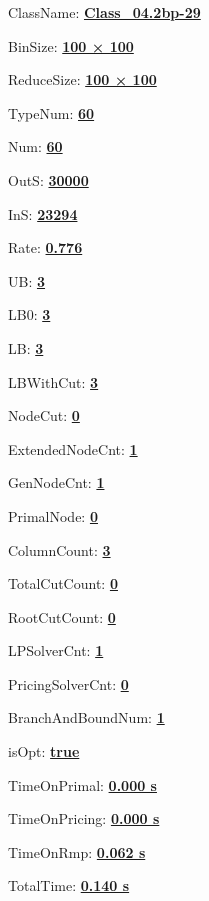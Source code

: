 \documentclass[11pt]{article}
\begin{document}
\pagestyle{empty}


ClassName: \underline{\textbf{Class_04.2bp-29}}
\par
BinSize: \underline{\textbf{100 × 100}}
\par
ReduceSize: \underline{\textbf{100 × 100}}
\par
TypeNum: \underline{\textbf{60}}
\par
Num: \underline{\textbf{60}}
\par
OutS: \underline{\textbf{30000}}
\par
InS: \underline{\textbf{23294}}
\par
Rate: \underline{\textbf{0.776}}
\par
UB: \underline{\textbf{3}}
\par
LB0: \underline{\textbf{3}}
\par
LB: \underline{\textbf{3}}
\par
LBWithCut: \underline{\textbf{3}}
\par
NodeCut: \underline{\textbf{0}}
\par
ExtendedNodeCnt: \underline{\textbf{1}}
\par
GenNodeCnt: \underline{\textbf{1}}
\par
PrimalNode: \underline{\textbf{0}}
\par
ColumnCount: \underline{\textbf{3}}
\par
TotalCutCount: \underline{\textbf{0}}
\par
RootCutCount: \underline{\textbf{0}}
\par
LPSolverCnt: \underline{\textbf{1}}
\par
PricingSolverCnt: \underline{\textbf{0}}
\par
BranchAndBoundNum: \underline{\textbf{1}}
\par
isOpt: \underline{\textbf{true}}
\par
TimeOnPrimal: \underline{\textbf{0.000 s}}
\par
TimeOnPricing: \underline{\textbf{0.000 s}}
\par
TimeOnRmp: \underline{\textbf{0.062 s}}
\par
TotalTime: \underline{\textbf{0.140 s}}
\par
\newpage
\end{document}

